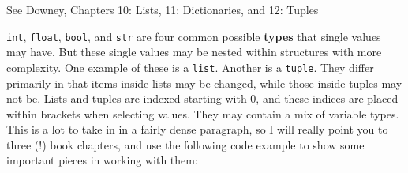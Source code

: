 \documentclass[a4paper,10pt]{scrartcl}
\begin{document}
\begin{framed}
See Downey, Chapters 10: Lists, 11: Dictionaries, and 12: Tuples
\end{framed}

\lstinline{int}, \lstinline{float}, \lstinline{bool}, and \lstinline{str} are four common possible \textbf{types} that single values may have. But these single values may be nested within structures with more complexity. One example of these is a \lstinline{list}. Another is a \lstinline{tuple}. They differ primarily in that items inside lists may be changed, while those inside tuples may not be. Lists and tuples are indexed starting with 0, and these indices are placed within brackets when selecting values. They may contain a mix of variable types. This is a lot to take in in a fairly dense paragraph, so I will really point you to three (!) book chapters, and use the following code example to show some important pieces in working with them:
\end{document}

